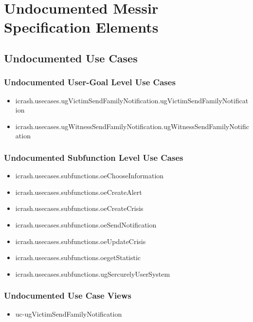 	
\chapter{Undocumented Messir Specification Elements}


\section[Undocumented Use Cases]{Undocumented Use Cases}


\subsection[Undocumented Use Cases - User-Goal Level]{Undocumented User-Goal Level Use Cases}
\begin{itemize}
\item icrash.usecases.ugVictimSendFamilyNotification.ugVictimSendFamilyNotification 
\item icrash.usecases.ugWitnessSendFamilyNotification.ugWitnessSendFamilyNotification 
\end{itemize}

\subsection[Undocumented Use Cases - Subfunction Level]{Undocumented Subfunction Level Use Cases}
\begin{itemize}
\item icrash.usecases.subfunctions.oeChooseInformation 
\item icrash.usecases.subfunctions.oeCreateAlert 
\item icrash.usecases.subfunctions.oeCreateCrisis 
\item icrash.usecases.subfunctions.oeSendNotification 
\item icrash.usecases.subfunctions.oeUpdateCrisis 
\item icrash.usecases.subfunctions.oegetStatistic 
\item icrash.usecases.subfunctions.ugSercurelyUserSystem 
\end{itemize}

\subsection[Undocumented Use Case Views]{Undocumented Use Case Views}
\begin{itemize}
\item uc-ugVictimSendFamilyNotification 
\end{itemize}




